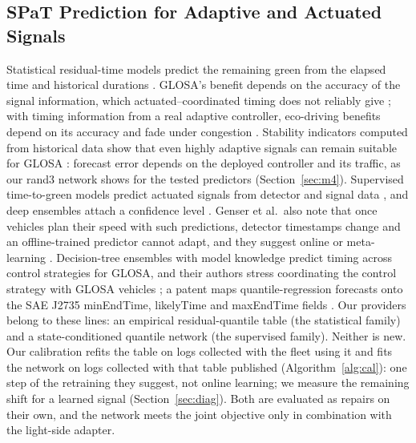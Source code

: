\subsection{SPaT Prediction for Adaptive and Actuated Signals}
Statistical residual-time models predict the remaining green from the elapsed time and historical durations
\cite{bodenheimer2014,mahler2014}. GLOSA's benefit depends on the accuracy of the signal information, which actuated--coordinated
timing does not reliably give \cite{stevanovic2013}; with timing information from a real adaptive controller, eco-driving benefits depend
on its accuracy and fade under congestion \cite{nyserda2019}. Stability indicators computed from historical data show that even highly adaptive signals can remain
suitable for GLOSA \cite{otto2025}: forecast error depends on the deployed controller and its traffic, as our rand3 network
shows for the tested predictors (Section~\ref{sec:m4}). Supervised time-to-green models predict actuated signals from detector and signal data
\cite{genser2024}, and deep ensembles attach a confidence level \cite{eteifa2025}. Genser et al.\ also note that once vehicles plan their
speed with such predictions, detector timestamps change and an offline-trained predictor cannot adapt, and they suggest online or
meta-learning \cite{genser2024}. Decision-tree ensembles with model knowledge predict timing across control strategies for GLOSA,
and their authors stress coordinating the control strategy with GLOSA vehicles \cite{malena2025}; a patent maps quantile-regression
forecasts onto the SAE J2735 minEndTime, likelyTime and maxEndTime fields \cite{ep3985636}. Our providers belong to these lines: an empirical
residual-quantile table (the statistical family) and a state-conditioned quantile network (the supervised family). Neither is new. Our
calibration refits the table on logs collected with the fleet using it and fits the network on logs collected with that table published
(Algorithm~\ref{alg:cal}): one step of the retraining they suggest, not online learning; we measure the remaining shift for a learned
signal (Section~\ref{sec:diag}). Both are
evaluated as repairs on their own, and the network meets the joint objective only in combination with the light-side adapter.

